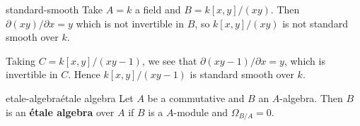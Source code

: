 \begin{example}{standard-smooth}
    Take $A = k$ a field and $B = k[x, y] / (xy)$. Then $\partial (xy) / \partial x = y$ which is not invertible in $B$, so $k[x, y] / (xy)$ is not standard smooth over $k$.
    
    Taking $C = k[x, y] / (xy - 1)$, we see that $\partial (xy - 1) / \partial x = y$, which is invertible in $C$. Hence $k[x, y] / (xy - 1)$ is standard smooth over $k$.
\end{example}

\begin{topic}{etale-algebra}{étale algebra}
    Let $A$ be a commutative  and $B$ an $A$-algebra. Then $B$ is an \textbf{étale algebra} over $A$ if $B$ is a  $A$-module and $\Omega_{B/A} = 0$.
\end{topic}
